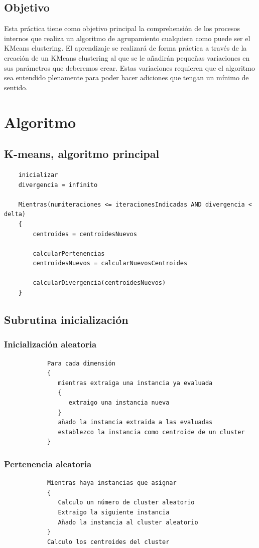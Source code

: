 \documentclass[a4paper]{report}
\begin{document}
	\section{Objetivo}
	
	Esta práctica tiene como objetivo principal la comprehensión de los procesos internos que realiza un algoritmo de agrupamiento cualquiera como puede ser el KMeans clustering. El aprendizaje se realizará de forma práctica a través de la creación de un KMeans clustering al que se le añadirán pequeñas variaciones en sus parámetros que deberemos crear.	Estas variaciones requieren que el algoritmo sea entendido plenamente para poder hacer adiciones que tengan un mínimo de sentido.
\chapter{Algoritmo}

	\section{K-means, algoritmo principal}
	
	\begin{verbatim}
	inicializar
	divergencia = infinito 
	
	Mientras(numiteraciones <= iteracionesIndicadas AND divergencia < delta)
	{
	    centroides = centroidesNuevos 
	
	    calcularPertenencias
	    centroidesNuevos = calcularNuevosCentroides
		
	    calcularDivergencia(centroidesNuevos) 
	}
	\end{verbatim}
	
	\section{Subrutina inicialización}
		\subsection{Inicialización aleatoria}
			\begin{verbatim}
			Para cada dimensión
			{
			   mientras extraiga una instancia ya evaluada
			   {
			      extraigo una instancia nueva
			   }
			   añado la instancia extraida a las evaluadas
			   establezco la instancia como centroide de un cluster
			}
			\end{verbatim}
		
		\subsection{Pertenencia aleatoria}
			\begin{verbatim}
			Mientras haya instancias que asignar
			{
			   Calculo un número de cluster aleatorio
			   Extraigo la siguiente instancia
			   Añado la instancia al cluster aleatorio
			}
			Calculo los centroides del cluster
			\end{verbatim}
		
\end{document}
